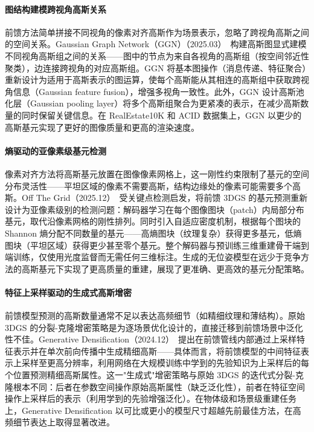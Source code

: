 \paragraph{图结构建模跨视角高斯关系}

前馈方法简单拼接不同视角的像素对齐高斯作为场景表示，忽略了跨视角高斯之间的空间关系。Gaussian Graph Network（GGN）（2025.03）~\cite{2503_16338}构建高斯图显式建模不同视角高斯组之间的关系——图中的节点为来自各视角的高斯组（按空间邻近性聚类），边连接跨视角的对应高斯组。GGN 将基本图操作（消息传递、特征聚合）重新设计为适用于高斯表示的图运算，使每个高斯能从其相连的高斯组中获取跨视角信息（Gaussian feature fusion），增强多视角一致性。此外，GGN 设计高斯池化层（Gaussian pooling layer）将多个高斯组聚合为更紧凑的表示，在减少高斯数量的同时保留关键信息。在 RealEstate10K 和 ACID 数据集上，GGN 以更少的高斯基元实现了更好的图像质量和更高的渲染速度。

\paragraph{熵驱动的亚像素级基元检测}

像素对齐方法将高斯基元放置在图像像素网格上，这一刚性约束限制了基元的空间分布灵活性——平坦区域的像素不需要高斯，结构边缘处的像素可能需要多个高斯。Off The Grid（2025.12）~\cite{2512_15508}受关键点检测启发，将前馈 3DGS 的基元预测重新设计为亚像素级别的检测问题：解码器学习在每个图像图块（patch）内局部分布基元，取代沿像素网格的刚性排列。同时引入自适应密度机制，根据每个图块的 Shannon 熵分配不同数量的基元——高熵图块（纹理复杂）获得更多基元，低熵图块（平坦区域）获得更少甚至零个基元。整个解码器与预训练三维重建骨干端到端训练，仅使用光度监督而无需任何三维标注。生成的无位姿模型在远少于竞争方法的高斯基元下实现了更高质量的重建，展现了更准确、更高效的基元分配策略。

\paragraph{特征上采样驱动的生成式高斯增密}

前馈模型预测的高斯数量通常不足以表达高频细节（如精细纹理和薄结构）。原始 3DGS 的分裂-克隆增密策略是为逐场景优化设计的，直接迁移到前馈场景中泛化性不佳。Generative Densification（2024.12）~\cite{2412_06234}提出在前馈管线内部通过上采样特征表示并在单次前向传播中生成精细高斯——具体而言，将前馈模型的中间特征表示上采样至更高分辨率，利用网络在大规模训练中学到的先验知识为上采样后的每个位置预测精细高斯属性。这一"生成式"增密策略与原始 3DGS 的迭代式分裂-克隆根本不同：后者在参数空间操作原始高斯属性（缺乏泛化性），前者在特征空间操作上采样后的表示（利用学到的先验增强泛化）。在物体级和场景级重建任务上，Generative Densification 以可比或更小的模型尺寸超越先前最佳方法，在高频细节表达上取得显著改进。

